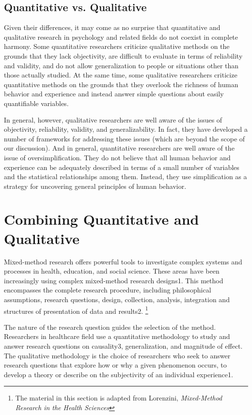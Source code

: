\subsection{Quantitative vs. Qualitative}

Given their differences, it may come as no surprise that quantitative and qualitative research in psychology and related fields do not coexist in complete harmony. Some quantitative researchers criticize qualitative methods on the grounds that they lack objectivity, are difficult to evaluate in terms of reliability and validity, and do not allow generalization to people or situations other than those actually studied. At the same time, some qualitative researchers criticize quantitative methods on the grounds that they overlook the richness of human behavior and experience and instead answer simple questions about easily quantifiable variables.

In general, however, qualitative researchers are well aware of the issues of objectivity, reliability, validity, and generalizability. In fact, they have developed a number of frameworks for addressing these issues (which are beyond the scope of our discussion). And in general, quantitative researchers are well aware of the issue of oversimplification. They do not believe that all human behavior and experience can be adequately described in terms of a small number of variables and the statistical relationships among them. Instead, they use simplification as a strategy for uncovering general principles of human behavior.


\section{Combining Quantitative and Qualitative}


Mixed-method research offers powerful tools to investigate complex systems and processes in health, education, and social science. These areas have been increasingly using complex mixed-method research designs1. This method encompasses the complete research procedure, including philosophical assumptions, research questions, design, collection, analysis, integration and structures of presentation of data and results2. \footnote{The material in this section is adapted from Lorenzini, \textit{Mixed-Method Research in the Health Sciences}\cite{lorenzini2017mixed}}

The nature of the research question guides the selection of the method. Researchers in healthcare field use a quantitative methodology to study and answer research questions on causality3, generalization, and magnitude of effect. The qualitative methodology is the choice of researchers who seek to answer research questions that explore how or why a given phenomenon occurs, to develop a theory or describe on the subjectivity of an individual experience1.

